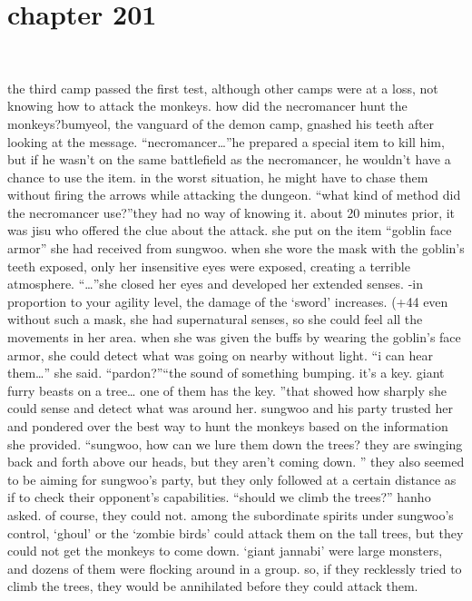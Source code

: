 \section{chapter 201}

                             




the third camp passed the first test, although other camps were at a loss, not knowing how to attack the monkeys.
 how did the necromancer hunt the monkeys?bumyeol, the vanguard of the demon camp, gnashed his teeth after looking at the message.
“necromancer…”he prepared a special item to kill him, but if he wasn’t on the same battlefield as the necromancer, he wouldn’t have a chance to use the item.
in the worst situation, he might have to chase them without firing the arrows while attacking the dungeon.
“what kind of method did the necromancer use?”they had no way of knowing it.
about 20 minutes prior, it was jisu who offered the clue about the attack.
she put on the item “goblin face armor” she had received from sungwoo.
 when she wore the mask with the goblin’s teeth exposed, only her insensitive eyes were exposed, creating a terrible atmosphere.
“…”she closed her eyes and developed her extended senses.
-in proportion to your agility level, the damage of the ‘sword’ increases.
 (+44%
even without such a mask, she had supernatural senses, so she could feel all the movements in her area.
when she was given the buffs by wearing the goblin’s face armor, she could detect what was going on nearby without light.
“i can hear them…” she said.
“pardon?”“the sound of something bumping.
 it’s a key.
 giant furry beasts on a tree… one of them has the key.
”that showed how sharply she could sense and detect what was around her.
sungwoo and his party trusted her and pondered over the best way to hunt the monkeys based on the information she provided.
“sungwoo, how can we lure them down the trees? they are swinging back and forth above our heads, but they aren’t coming down.
”
they also seemed to be aiming for sungwoo’s party, but they only followed at a certain distance as if to check their opponent’s capabilities.
“should we climb the trees?” hanho asked.
of course, they could not.
 among the subordinate spirits under sungwoo’s control, ‘ghoul’ or the ‘zombie birds’ could attack them on the tall trees, but they could not get the monkeys to come down.
‘giant jannabi’ were large monsters, and dozens of them were flocking around in a group.
so, if they recklessly tried to climb the trees, they would be annihilated before they could attack them.
